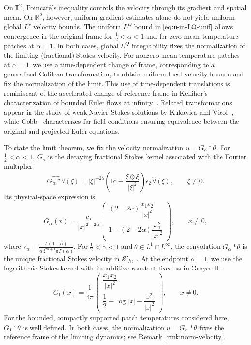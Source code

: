 \documentclass[reqno,11pt,a4paper]{amsart}
\begin{document}
On $\mathbb T^2$, Poincar\'e's inequality controls
the velocity through its gradient and spatial mean.
On $\mathbb R^2$, however, uniform gradient estimates
alone do not yield uniform global $L^p$ velocity bounds.
The uniform $L^Q$ bound in \eqref{eq:u-in-LQ-unif}
allows convergence in the original frame for
$\frac12<\alpha<1$ and for zero-mean temperature patches
at $\alpha=1$.
In both cases, global $L^Q$ integrability fixes
the normalization of the limiting (fractional) Stokes velocity.
For nonzero-mean temperature patches at $\alpha=1$,
we use a time-dependent change of frame, corresponding
to a generalized Galilean transformation, to obtain
uniform local velocity bounds and fix the normalization
of the limit.
This use of time-dependent translations is reminiscent
of the accelerated change of reference frame in
Kelliher's characterization of bounded Euler flows
at infinity~\cite[Eq.~(1.5) and Lemma~6.1]{Kel15}.
Related transformations appear in the study of weak
Navier-Stokes solutions by Kukavica and Vicol~\cite{KV08},
while Cobb~\cite{Cobb24} characterizes far-field conditions
ensuring equivalence between the original and projected
Euler equations.

To state the limit theorem, we fix the velocity normalization $u=G_\alpha*\theta$. 
For $\frac12<\alpha<1$, $G_\alpha$ is the decaying fractional
Stokes kernel associated with the Fourier multiplier
\[
  \widehat{G_\alpha*\theta}(\xi)
  =
  |\xi|^{-2\alpha}
  \left(\mathrm{Id}-\frac{\xi\otimes\xi}{|\xi|^2}\right)
  e_2\,\widehat\theta(\xi),
  \qquad \xi\ne0.
\]
Its physical-space expression is
\begin{equation}\label{def:G-alp-frac}
  G_\alpha(x)
  =
  \frac{c_\alpha}{|x|^{2-2\alpha}}
  \begin{pmatrix}
    (2-2\alpha)\dfrac{x_1x_2}{|x|^2}\\[2mm]
    1-(2-2\alpha)\dfrac{x_1^2}{|x|^2}
  \end{pmatrix},
  \qquad x\ne0,
\end{equation}
where
$c_\alpha = \frac{\Gamma(1-\alpha)}{\alpha\,2^{2\alpha+1}\pi\,\Gamma(\alpha)}$.
For $\frac12<\alpha<1$ and $\theta\in L^1\cap L^\infty$,
the convolution $G_\alpha*\theta$ is the unique
fractional Stokes velocity in $\mathcal S'_h$,~\cite[Proposition~2.1]{Cobb23}.
At the endpoint $\alpha=1$, we use the logarithmic Stokes kernel
with its additive constant fixed as
in Grayer II~\cite[Section~2]{Gray23}:
\begin{equation}\label{def:G-alp=1}
  G_1(x)
  =
  \frac{1}{4\pi}
  \begin{pmatrix}
    \dfrac{x_1x_2}{|x|^2}\\[2mm]
    \dfrac12-\log|x|-\dfrac{x_1^2}{|x|^2}
  \end{pmatrix},
  \qquad x\ne0.
\end{equation}
For the bounded, compactly supported patch temperatures
considered here, $G_1*\theta$ is well defined.
In both cases, the normalization $u=G_\alpha*\theta$
fixes the reference frame of the limiting dynamics;
see Remark~\ref{rmk:norm-velocity}.
\end{document}
